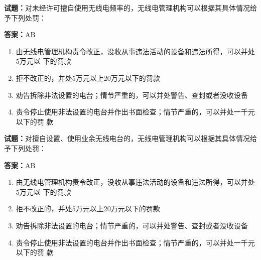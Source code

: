 \documentclass{ctexbook}
\begin{document}




\vspace{1em}

\textbf{试题：}对未经许可擅自使用无线电频率的，无线电管理机构可以根据其具体情况给予下列处罚： 

\textbf{答案：}AB 

\begin{enumerate}[leftmargin=3em]
  \item 由无线电管理机构责令改正，没收从事违法活动的设备和违法所得，可以并处5万元以
下的罚款 

  \item 拒不改正的，并处5万元以上20万元以下的罚款 

  \item 劝告拆除非法设置的电台；情节严重的，可以并处警告、查封或者没收设备 

  \item 责令停止使用非法设置的电台并作出书面检查；情节严重的，可以并处一千元以下的罚
款 

\end{enumerate}





\vspace{1em}

\textbf{试题：}对擅自设置、使用业余无线电台的，无线电管理机构可以根据其具体情况给予下列处罚： 

\textbf{答案：}AB 

\begin{enumerate}[leftmargin=3em]
  \item 由无线电管理机构责令改正，没收从事违法活动的设备和违法所得，可以并处5万元以
下的罚款 

  \item 拒不改正的，并处5万元以上20万元以下的罚款 

  \item 劝告拆除非法设置的电台；情节严重的，可以并处警告、查封或者没收设备 

  \item 责令停止使用非法设置的电台并作出书面检查；情节严重的，可以并处一千元以下的罚
款 

\end{enumerate}



\end{document}
